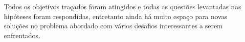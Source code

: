 Todos os objetivos traçados foram atingidos e todas as questões levantadas nas hipóteses foram respondidas, entretanto ainda há muito espaço para novas soluções no problema abordado com vários desafios interessantes a serem enfrentados.

